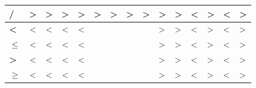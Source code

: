 \documentclass[a4paper, 11pt]{article}
\begin{document}
\begin{table}[!ht]
\begin{tabular}{|l|c|c|c|c|c|c|c|c|l|l|l|l|l|l|}
\textbf{/}              & \textgreater{}                               & \textgreater{}                               & \textgreater{}                               & \textgreater{}                               & \textgreater{}                               & \textgreater{}                               & \textgreater{}                               & \textgreater{}                               & \textgreater{}          & \textgreater{}          & \textless{}          & \textgreater{}          & \textless{}          & \textgreater{}          \\ \hline
\textbf{\textless{}}    & \textless{}                                  & \textless{}                                  & \textless{}                                  & \textless{}                                  &                                              &                                              &                                              &                                              & \textgreater{}          & \textgreater{}          & \textless{}          & \textgreater{}          & \textless{}          & \textgreater{}          \\ \hline
\textbf{$\leq$}         & \textless{}                                  & \textless{}                                  & \textless{}                                  & \textless{}                                  &                                              &                                              &                                              &                                              & \textgreater{}          & \textgreater{}          & \textless{}          & \textgreater{}          & \textless{}          & \textgreater{}          \\ \hline
\textbf{\textgreater{}} & \textless{}                                  & \textless{}                                  & \textless{}                                  & \textless{}                                  &                                              &                                              &                                              &                                              & \textgreater{}          & \textgreater{}          & \textless{}          & \textgreater{}          & \textless{}          & \textgreater{}          \\ \hline
\textbf{$\geq$}         & \textless{}                                  & \textless{}                                  & \textless{}                                  & \textless{}                                  &                                              &                                              &                                              &                                              & \textgreater{}          & \textgreater{}          & \textless{}          & \textgreater{}          & \textless{}          & \textgreater{}          \\ \hline

\end{tabular}
\end{table}
\end{document}
